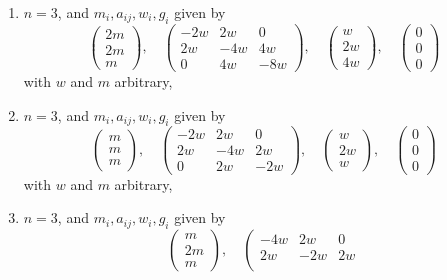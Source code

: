 \begin{lemma}
\begin{enumerate}
\item
\label{item-up-up}
$n = 3$, and $m_i, a_{ij}, w_i, g_i$ given by
$$
\left(
\begin{matrix}
2m \\
2m \\
m
\end{matrix}
\right),
\quad
\left(
\begin{matrix}
-2w & 2w & 0 \\
2w & -4w & 4w \\
0 & 4w & -8w
\end{matrix}
\right),
\quad
\left(
\begin{matrix}
w \\
2w \\
4w
\end{matrix}
\right),
\quad
\left(
\begin{matrix}
0 \\
0 \\
0
\end{matrix}
\right)
$$
with $w$ and $m$ arbitrary,
\item
\label{item-up-down}
$n = 3$, and $m_i, a_{ij}, w_i, g_i$ given by
$$
\left(
\begin{matrix}
m \\
m \\
m
\end{matrix}
\right),
\quad
\left(
\begin{matrix}
-2w & 2w & 0 \\
2w & -4w & 2w \\
0 & 2w & -2w
\end{matrix}
\right),
\quad
\left(
\begin{matrix}
w \\
2w \\
w
\end{matrix}
\right),
\quad
\left(
\begin{matrix}
0 \\
0 \\
0
\end{matrix}
\right)
$$
with $w$ and $m$ arbitrary,
\item
\label{item-down-up}
$n = 3$, and $m_i, a_{ij}, w_i, g_i$ given by
$$
\left(
\begin{matrix}
m \\
2m \\
m
\end{matrix}
\right),
\quad
\left(
\begin{matrix}
-4w & 2w & 0 \\
2w & -2w & 2w \\

\end{matrix}$$
\end{enumerate}
\end{lemma}
